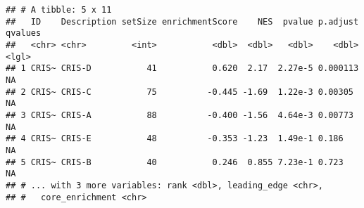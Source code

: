 \documentclass[
]{article}
\newenvironment{Shaded}{\begin{snugshade}}{\end{snugshade}}
\newcommand{\CommentTok}[1]{\textcolor[rgb]{0.56,0.35,0.01}{\textit{#1}}}
\newcommand{\DataTypeTok}[1]{\textcolor[rgb]{0.13,0.29,0.53}{#1}}
\newcommand{\DecValTok}[1]{\textcolor[rgb]{0.00,0.00,0.81}{#1}}
\newcommand{\FloatTok}[1]{\textcolor[rgb]{0.00,0.00,0.81}{#1}}
\newcommand{\KeywordTok}[1]{\textcolor[rgb]{0.13,0.29,0.53}{\textbf{#1}}}
\newcommand{\NormalTok}[1]{#1}
\newcommand{\OperatorTok}[1]{\textcolor[rgb]{0.81,0.36,0.00}{\textbf{#1}}}
\newcommand{\StringTok}[1]{\textcolor[rgb]{0.31,0.60,0.02}{#1}}
\begin{document}
\begin{Shaded}
\end{Shaded}

\begin{verbatim}
## # A tibble: 5 x 11
##   ID    Description setSize enrichmentScore    NES  pvalue p.adjust qvalues
##   <chr> <chr>         <int>           <dbl>  <dbl>   <dbl>    <dbl> <lgl>  
## 1 CRIS~ CRIS-D           41           0.620  2.17  2.27e-5 0.000113 NA     
## 2 CRIS~ CRIS-C           75          -0.445 -1.69  1.22e-3 0.00305  NA     
## 3 CRIS~ CRIS-A           88          -0.400 -1.56  4.64e-3 0.00773  NA     
## 4 CRIS~ CRIS-E           48          -0.353 -1.23  1.49e-1 0.186    NA     
## 5 CRIS~ CRIS-B           40           0.246  0.855 7.23e-1 0.723    NA     
## # ... with 3 more variables: rank <dbl>, leading_edge <chr>,
## #   core_enrichment <chr>
\end{verbatim}
\end{document}
